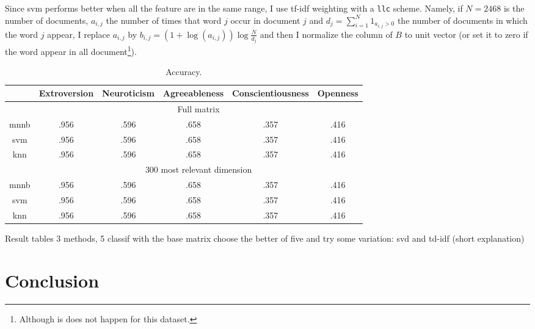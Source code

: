 Since \gls{svm} performs better when all the feature are in the same range, I use tf-idf weighting with a \texttt{llc} scheme. Namely, if $N=2468$ is the number of documents, $a_{i,j}$ the number of times that word $j$ occur in document $j$ and $d_j = \sum_{i=1}^N 1_{a_{i,j}>0}$ the number of documents in which the word $j$ appear, I replace $a_{i,j}$ by $b_{i,j} = (1+\log(a_{i,j}))\log\frac{N}{d_j}$ and then I normalize the column of $B$ to unit vector (or set it to zero if the word appear in all document\footnote{Although is does not happen for this dataset.}).

\begin{table}[hb]
	\centering
	\begin{tabular}{cccccc}
		\toprule
		& Extroversion & Neuroticism & Agreeableness & Conscientiousness & Openness \tabularnewline
		\midrule
		& \multicolumn{5}{c}{Full matrix} \tabularnewline
		\cmidrule(r){2-6}
		\gls{mnnb} & .956 & .596 & .658 & .357 & .416 \tabularnewline
   		\gls{svm} & .956 & .596 & .658 & .357 & .416 \tabularnewline
   		\gls{knn} & .956 & .596 & .658 & .357 & .416 \tabularnewline
		& \multicolumn{5}{c}{300 most relevant dimension} \tabularnewline
		\cmidrule(r){2-6}
		\gls{mnnb} & .956 & .596 & .658 & .357 & .416 \tabularnewline
   		\gls{svm} & .956 & .596 & .658 & .357 & .416 \tabularnewline
   		\gls{knn} & .956 & .596 & .658 & .357 & .416 \tabularnewline
		\bottomrule
	\end{tabular}
	\caption{Accuracy.}
	\label{tab:res}
\end{table}

Result tables
3 methods, 5 classif with the base matrix
choose the better of five and try some variation: svd and td-idf (short
explanation)

\section{Conclusion}
